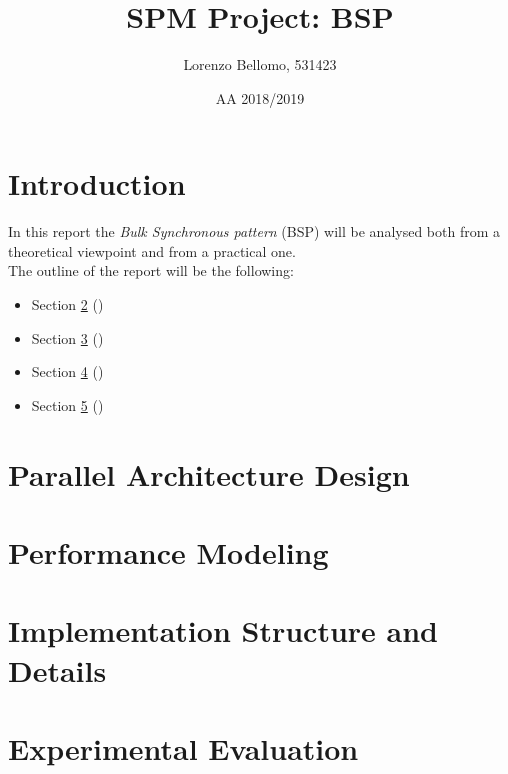 \documentclass[]{article}
\title{SPM Project: BSP}
\author{Lorenzo Bellomo, 531423}
\date{AA 2018/2019}
\begin{document}
\maketitle

\section{Introduction}
In this report the \emph{Bulk Synchronous pattern} (BSP) will be analysed both from a theoretical viewpoint and from a practical one. \\
The outline of the report will be the following:
\begin{itemize}
	\item Section \ref{sec:parDesign} ()
	\item Section \ref{sec:perfModel} ()
	\item Section \ref{sec:implDetails} ()
	\item Section \ref{sec:eval} ()
\end{itemize}

\section{Parallel Architecture Design}
\label{sec:parDesign}

\section{Performance Modeling}
\label{sec:perfModel}

\section{Implementation Structure and Details}
\label{sec:implDetails}

\section{Experimental Evaluation}
\label{sec:eval}
\end{document}
